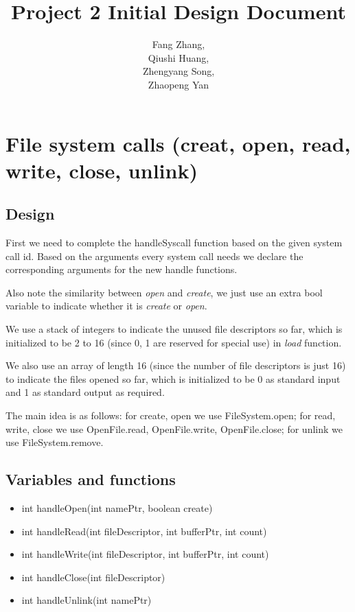 \documentclass[a4paper,10pt]{article}
\title{Project 2 Initial Design Document}
\author{Fang Zhang,\\
Qiushi Huang,\\
Zhengyang Song,\\
Zhaopeng Yan
}
\begin{document}
\maketitle


\section{File system calls (creat, open, read, write, close, unlink)}

\subsection{Design}

First we need to complete the handleSyscall function based on the given system call id. Based on the arguments every system call needs we declare the corresponding arguments for the new handle functions.

Also note the similarity between \emph{open} and \emph{create}, we just use an extra bool variable to indicate whether it is \emph{create} or \emph{open}.

We use a stack of integers to indicate the unused file descriptors so far, which is initialized to be 2 to 16 (since 0, 1 are reserved for special use) in \emph{load} function.

We also use an array of length 16 (since the number of file descriptors is just 16) to indicate the files opened so far, which is initialized to be 0 as standard input and 1 as standard output as required.

The main idea is as follows: for create, open we use FileSystem.open; for read, write, close we use OpenFile.read, OpenFile.write, OpenFile.close; for unlink we use FileSystem.remove.

\subsection{Variables and functions}
\begin{itemize}
\item int handleOpen(int namePtr, boolean create)
\item int handleRead(int fileDescriptor, int bufferPtr, int count)
\item int handleWrite(int fileDescriptor, int bufferPtr, int count)
\item int handleClose(int fileDescriptor)
\item int handleUnlink(int namePtr)
\end{itemize}
\end{document}
